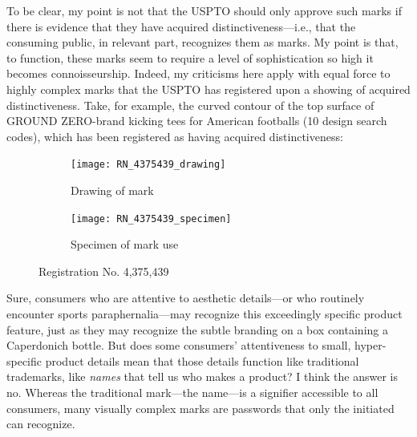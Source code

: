 \documentclass[letterpaper, 11pt, oneside]{article}
\begin{document}
To be clear, my point is not that the USPTO should only approve such marks if there is evidence that they have acquired distinctiveness—i.e., that the consuming public, in relevant part, recognizes them as marks. My point is that, to function, these marks seem to require a level of sophistication so high it becomes connoisseurship. Indeed, my criticisms here apply with equal force to highly complex marks that the USPTO has registered upon a showing of acquired distinctiveness. Take, for example, the curved contour of the top surface of GROUND ZERO-brand kicking tees for American footballs (10 design search codes), which has been registered as having acquired distinctiveness:

\begin{figure}[H]
\centering
\begin{subfigure}[h]{0.2\linewidth}
\texttt{[image: RN\_4375439\_drawing]} \
\caption{Drawing of mark}
\end{subfigure}
\hspace{30pt}
\begin{subfigure}[h]{0.3\linewidth}
\texttt{[image: RN\_4375439\_specimen]} \
\caption{Specimen of mark use}
\end{subfigure}
\caption*{Registration No. 4,375,439}
\end{figure}
\par

\noindent Sure, consumers who are attentive to aesthetic details—or who routinely encounter sports paraphernalia—may recognize this exceedingly specific product feature, just as they may recognize the subtle branding on a box containing a Caperdonich bottle. But does some consumers' attentiveness to small, hyper-specific product details mean that those details function like traditional trademarks, like \textit{names} that tell us who makes a product? I think the answer is no. Whereas the traditional mark—the name—is a signifier accessible to all consumers, many visually complex marks are passwords that only the initiated can recognize.
\end{document}
